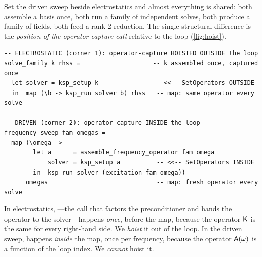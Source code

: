 Set the driven sweep beside electrostatics and almost everything is shared: both
assemble a basis once, both run a family of independent solves, both produce a
family of fields, both feed a rank-2 reduction. The single structural difference
is the \emph{position of the operator-capture call} relative to the loop
(\cref{fig:hoist}).

\begin{lstlisting}[style=l4style]
-- ELECTROSTATIC (corner 1): operator-capture HOISTED OUTSIDE the loop
solve_family k rhss =                    -- k assembled once, captured once
  let solver = ksp_setup k               -- <<-- SetOperators OUTSIDE
  in  map (\b -> ksp_run solver b) rhss   -- map: same operator every solve

-- DRIVEN (corner 2): operator-capture INSIDE the loop
frequency_sweep fam omegas =
  map (\omega ->
        let a      = assemble_frequency_operator fam omega
            solver = ksp_setup a          -- <<-- SetOperators INSIDE
        in  ksp_run solver (excitation fam omega))
      omegas                              -- map: fresh operator every solve
\end{lstlisting}

In electrostatics, ---the call that factors the preconditioner and
hands the operator to the solver---happens \emph{once}, before the map, because the
operator $\mathsf{K}$ is the same for every right-hand side. We \emph{hoist} it out of
the loop. In the driven sweep,  happens \emph{inside} the map,
once per frequency, because the operator $\mathsf{A}(\omega)$ is a function of the
loop index. We \emph{cannot} hoist it.

